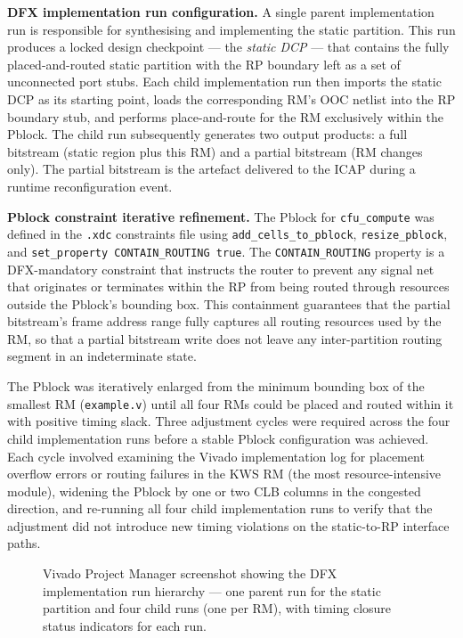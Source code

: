 \textbf{DFX implementation run configuration.} A single parent implementation run is responsible for synthesising and implementing the static partition. This run produces a locked design checkpoint — the \textit{static DCP} — that contains the fully placed-and-routed static partition with the RP boundary left as a set of unconnected port stubs. Each child implementation run then imports the static DCP as its starting point, loads the corresponding RM's OOC netlist into the RP boundary stub, and performs place-and-route for the RM exclusively within the Pblock. The child run subsequently generates two output products: a full bitstream (static region plus this RM) and a partial bitstream (RM changes only). The partial bitstream is the artefact delivered to the ICAP during a runtime reconfiguration event.

\textbf{Pblock constraint iterative refinement.} The Pblock for \texttt{cfu\_compute} was defined in the \texttt{.xdc} constraints file using \texttt{add\_cells\_to\_pblock}, \texttt{resize\_pblock}, and \texttt{set\_property CONTAIN\_ROUTING true}. The \texttt{CONTAIN\_ROUTING} property is a DFX-mandatory constraint that instructs the router to prevent any signal net that originates or terminates within the RP from being routed through resources outside the Pblock's bounding box. This containment guarantees that the partial bitstream's frame address range fully captures all routing resources used by the RM, so that a partial bitstream write does not leave any inter-partition routing segment in an indeterminate state.

The Pblock was iteratively enlarged from the minimum bounding box of the smallest RM (\texttt{example.v}) until all four RMs could be placed and routed within it with positive timing slack. Three adjustment cycles were required across the four child implementation runs before a stable Pblock configuration was achieved. Each cycle involved examining the Vivado implementation log for placement overflow errors or routing failures in the KWS RM (the most resource-intensive module), widening the Pblock by one or two CLB columns in the congested direction, and re-running all four child implementation runs to verify that the adjustment did not introduce new timing violations on the static-to-RP interface paths.

\begin{figure}[htbp]
\centering
{}
\caption{Vivado Project Manager screenshot showing the DFX implementation run hierarchy — one parent run for the static partition and four child runs (one per RM), with timing closure status indicators for each run.}
\end{figure}

